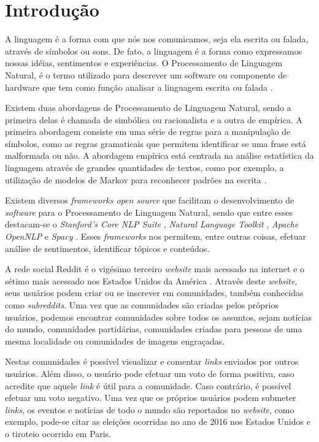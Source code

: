 \chapter{Introdução}
\label{chap:introducao}
A linguagem é a forma com que nós nos comunicamos, seja ela escrita ou
falada, através de símbolos ou sons. De fato, a linguagem é a forma como
expressamos nossas idéias, sentimentos e experiências. O Processamento de
Linguagem Natural, é o termo utilizado para descrever um software ou componente
de hardware que tem como função analisar a linguagem escrita ou falada
\cite{jacksonmoulinier2007}.

Existem duas abordagens de Processamento de Linguagem Natural, sendo a primeira
delas é chamada de simbólica ou racionalista e a outra de empírica. A primeira
abordagem consiste em uma série de regras para a manipulação de símbolos, como as regras gramaticais que permitem identificar se uma frase está malformada ou não. A abordagem
empírica está centrada na análise estatística da linguagem através de grandes quantidades
de textos, como por exemplo, a utilização de modelos de Markov para reconhecer padrões
na escrita \cite{jacksonmoulinier2007}.

Existem diversos \textit{frameworks open source} que facilitam o desenvolvimento
de \textit{software} para o Processamento de Linguagem Natural, sendo que entre
esses destacam-se o \textit{Stanford's Core NLP Suite} \cite{corenlp}, \textit{Natural Language
Toolkit} \cite{nltk}, \textit{Apache OpenNLP} \cite{opennlp} e \textit{Spacy}
\cite{spacy}.
Esses \textit{frameworks} nos permitem, entre outras coisas, efetuar análise de
sentimentos, identificar tópicos e conteúdos.

A rede social Reddit é o vigésimo terceiro \textit{website} mais acessado na
internet e o sétimo mais acessado nos Estados Unidos da América \cite{alexa}.
Através deste \textit{website}, seus usuários podem criar ou se inscrever em
comunidades, também conhecidas como \textit{subreddits}.
Uma vez que as comunidades são criadas pelos próprios usuários, podemos encontrar
comunidades sobre todos os assuntos, sejam notícias do mundo, comunidades
partidárias, comunidades criadas para pessoas de uma mesma localidade ou comunidades
de imagens engraçadas.

Nestas comunidades é possível visualizar e comentar \textit{links} enviados por
outros usuários.
Além disso, o usuário pode efetuar um voto de forma positiva, caso acredite que
aquele \textit{link} é útil para a comunidade. Caso contrário, é possível
efetuar um voto negativo.
Uma vez que os próprios usuários podem submeter \textit{links}, os eventos e
notícias de todo o mundo são reportados no \textit{website}, como exemplo,
pode-se citar as eleições ocorridas no ano de 2016 nos Estados Unidos e o
tiroteio ocorrido em Paris.

